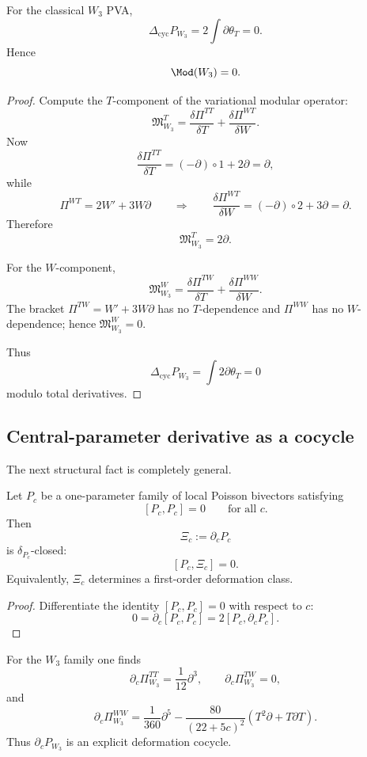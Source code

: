 \begin{theorem}\label{thm:W3mod0}
For the classical $W_3$ PVA,
\[
\Delta_{\mathrm{cyc}}P_{W_3}=2\int \partial\theta_T=0.
\]
Hence
\[
\Mod(W_3)=0.
\]
\end{theorem}

\begin{proof}
Compute the $T$-component of the variational modular operator:
\[
\mathfrak M_{W_3}^T
=
\frac{\delta \Pi^{TT}}{\delta T}
+
\frac{\delta \Pi^{WT}}{\delta W}.
\]
Now
\[
\frac{\delta \Pi^{TT}}{\delta T}=(-\partial)\circ 1+2\partial=\partial,
\]
while
\[
\Pi^{WT}=2W'+3W\partial
\qquad\Longrightarrow\qquad
\frac{\delta \Pi^{WT}}{\delta W}=(-\partial)\circ 2 + 3\partial=\partial.
\]
Therefore
\[
\mathfrak M_{W_3}^T=2\partial.
\]

For the $W$-component,
\[
\mathfrak M_{W_3}^W
=
\frac{\delta \Pi^{TW}}{\delta T}
+
\frac{\delta \Pi^{WW}}{\delta W}.
\]
The bracket $\Pi^{TW}=W'+3W\partial$ has no $T$-dependence and
$\Pi^{WW}$ has no $W$-dependence; hence $\mathfrak M_{W_3}^W=0$.

Thus
\[
\Delta_{\mathrm{cyc}}P_{W_3}=\int 2\partial\theta_T=0
\]
modulo total derivatives.
\end{proof}

\subsection{Central-parameter derivative as a cocycle}

The next structural fact is completely general.

\begin{theorem}\label{thm:parameter-cocycle}
Let $P_c$ be a one-parameter family of local Poisson bivectors satisfying
\[
[P_c,P_c]=0
\qquad\text{for all }c.
\]
Then
\[
\Xi_c:=\partial_c P_c
\]
is $\delta_{P_c}$-closed:
\[
[P_c,\Xi_c]=0.
\]
Equivalently, $\Xi_c$ determines a first-order deformation class.
\end{theorem}

\begin{proof}
Differentiate the identity $[P_c,P_c]=0$ with respect to $c$:
\[
0=\partial_c[P_c,P_c]=2[P_c,\partial_cP_c].
\]
\end{proof}

For the $W_3$ family one finds
\[
\partial_c \Pi^{TT}_{W_3}=\frac1{12}\partial^3,\qquad
\partial_c\Pi^{TW}_{W_3}=0,
\]
and
\[
\partial_c \Pi^{WW}_{W_3}
=
\frac1{360}\partial^5-\frac{80}{(22+5c)^2}(T^2\partial+T\partial T).
\]
Thus $\partial_c P_{W_3}$ is an explicit deformation cocycle.

